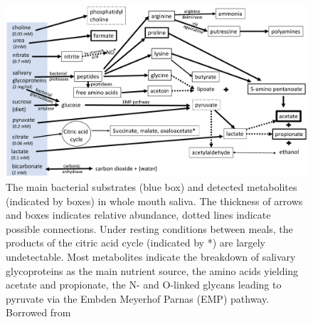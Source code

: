 \begin{figure}[!ht]
    \centering
    \includegraphics[width=1\linewidth]{./figure/saliva_content.jpeg}
    \caption{The main bacterial substrates (blue box) and detected metabolites (indicated by boxes) in whole mouth saliva. 
    The thickness of arrows and boxes indicates relative abundance, dotted lines indicate possible connections. 
    Under resting conditions between meals, the products of the citric acid cycle (indicated by *) are largely undetectable. 
    Most metabolites indicate the breakdown of salivary glycoproteins as the main nutrient source, the amino acids 
    yielding acetate and propionate, the N- and O-linked glycans leading to pyruvate via the Embden Meyerhof Parnas (EMP) pathway. 
    Borrowed from  \cite{Carpenter2020}}
    \label{fig:saliva_content}
\end{figure}

